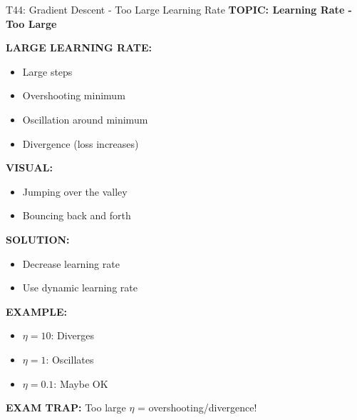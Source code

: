\documentclass[8pt]{beamer}
\begin{document}
	\begin{frame}{T44: Gradient Descent - Too Large Learning Rate}
		\fontsize{6.5}{7.5}\selectfont
		\textbf{TOPIC: Learning Rate - Too Large}
		
		\vspace{0.1cm}
		\textbf{LARGE LEARNING RATE:}
		\begin{itemize}
			\item Large steps
			\item Overshooting minimum
			\item Oscillation around minimum
			\item Divergence (loss increases)
		\end{itemize}
		
		\vspace{0.1cm}
		\textbf{VISUAL:}
		\begin{itemize}
			\item Jumping over the valley
			\item Bouncing back and forth
		\end{itemize}
		
		\vspace{0.1cm}
		\textbf{SOLUTION:}
		\begin{itemize}
			\item Decrease learning rate
			\item Use dynamic learning rate
		\end{itemize}
		
		\vspace{0.1cm}
		\textbf{EXAMPLE:}
		\begin{itemize}
			\item $\eta = 10$: Diverges
			\item $\eta = 1$: Oscillates
			\item $\eta = 0.1$: Maybe OK
		\end{itemize}
		
		\textcolor{myred}{\textbf{EXAM TRAP:}} Too large $\eta$ = \textcolor{myblue}{overshooting/divergence}!
	\end{frame}
	
\end{document}
